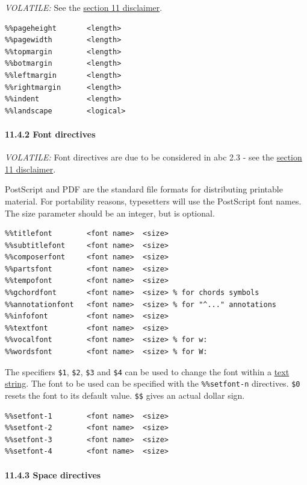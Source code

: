 \documentclass[oneside]{book}
\let\oldparagraph\paragraph
\renewcommand{\paragraph}[1]{\oldparagraph{#1}\mbox{}}
\begin{document}
\emph{VOLATILE:} See the \protect\hyperlink{disclaimer}{section 11
disclaimer}.

\begin{verbatim}
%%pageheight       <length>
%%pagewidth        <length>
%%topmargin        <length>
%%botmargin        <length>
%%leftmargin       <length>
%%rightmargin      <length>
%%indent           <length>
%%landscape        <logical>
\end{verbatim}

\hypertarget{font_directives}{\paragraph{11.4.2 Font
directives}\label{font_directives}}

\emph{VOLATILE:} Font directives are due to be considered in abc 2.3 -
see the \protect\hyperlink{disclaimer}{section 11 disclaimer}.

PostScript and PDF are the standard file formats for distributing
printable material. For portability reasons, typesetters will use the
PostScript font names. The size parameter should be an integer, but is
optional.

\begin{verbatim}
%%titlefont        <font name>  <size>
%%subtitlefont     <font name>  <size>
%%composerfont     <font name>  <size>
%%partsfont        <font name>  <size>
%%tempofont        <font name>  <size>
%%gchordfont       <font name>  <size> % for chords symbols
%%annotationfont   <font name>  <size> % for "^..." annotations
%%infofont         <font name>  <size>
%%textfont         <font name>  <size>
%%vocalfont        <font name>  <size> % for w:
%%wordsfont        <font name>  <size> % for W:
\end{verbatim}

The specifiers \texttt{\$1}, \texttt{\$2}, \texttt{\$3} and \texttt{\$4}
can be used to change the font within a
\protect\hyperlink{text_string_definition}{text string}. The font to be
used can be specified with the \texttt{\%\%setfont-n} directives.
\texttt{\$0} resets the font to its default value. \texttt{\$\$} gives
an actual dollar sign.

\begin{verbatim}
%%setfont-1        <font name>  <size>
%%setfont-2        <font name>  <size>
%%setfont-3        <font name>  <size>
%%setfont-4        <font name>  <size>
\end{verbatim}

\hypertarget{space_directives}{\paragraph{11.4.3 Space
directives}\label{space_directives}}
\end{document}
